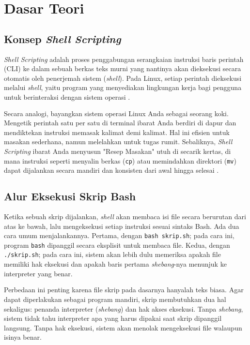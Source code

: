 \newpage
\section{Dasar Teori}

\subsection{Konsep \textit{Shell Scripting}}
\textit{Shell Scripting} adalah proses penggabungan serangkaian instruksi baris perintah (CLI) ke dalam sebuah berkas teks murni yang nantinya akan dieksekusi secara otomatis oleh penerjemah sistem (\textit{shell}). Pada Linux, setiap perintah dieksekusi melalui \textit{shell}, yaitu program yang menyediakan lingkungan kerja bagi pengguna untuk berinteraksi dengan sistem operasi \cite{robbins2005classic}. 

Secara analogi, bayangkan sistem operasi Linux Anda sebagai seorang koki. Mengetik perintah satu per satu di terminal ibarat Anda berdiri di dapur dan mendiktekan instruksi memasak kalimat demi kalimat. Hal ini efisien untuk masakan sederhana, namun melelahkan untuk tugas rumit. Sebaliknya, \textit{Shell Scripting} ibarat Anda menyusun "Resep Masakan" utuh di secarik kertas, di mana instruksi seperti menyalin berkas (\texttt{cp}) atau memindahkan direktori (\texttt{mv}) dapat dijalankan secara mandiri dan konsisten dari awal hingga selesai \cite{das2012unix}.

\subsection{Alur Eksekusi Skrip Bash}
Ketika sebuah skrip dijalankan, \textit{shell} akan membaca isi file secara berurutan dari atas ke bawah, lalu mengeksekusi setiap instruksi sesuai sintaks Bash. Ada dua cara umum menjalankannya. Pertama, dengan \texttt{bash skrip.sh}; pada cara ini, program \texttt{bash} dipanggil secara eksplisit untuk membaca file. Kedua, dengan \texttt{./skrip.sh}; pada cara ini, sistem akan lebih dulu memeriksa apakah file memiliki hak eksekusi dan apakah baris pertama \textit{shebang}-nya menunjuk ke interpreter yang benar.

Perbedaan ini penting karena file skrip pada dasarnya hanyalah teks biasa. Agar dapat diperlakukan sebagai program mandiri, skrip membutuhkan dua hal sekaligus: penanda interpreter (\textit{shebang}) dan hak akses eksekusi. Tanpa \textit{shebang}, sistem tidak tahu interpreter apa yang harus dipakai saat skrip dipanggil langsung. Tanpa hak eksekusi, sistem akan menolak mengeksekusi file walaupun isinya benar.

